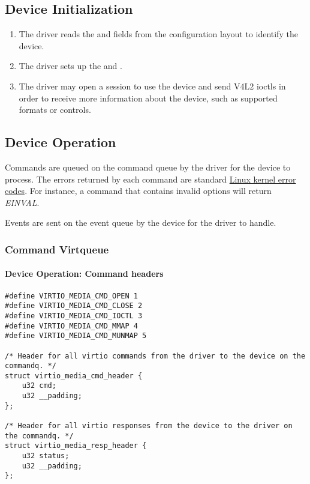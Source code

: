 \subsection{Device Initialization}

\begin{enumerate}
\item The driver reads the  and  fields
from the configuration layout to identify the device.
\item The driver sets up the  and .
\item The driver may open a session to use the device and send V4L2 ioctls in
order to receive more information about the device, such as supported
formats or controls.
\end{enumerate}

\subsection{Device Operation}\label{sec:Device Types / Media Device / Device Operation}

Commands are queued on the command queue by the driver for the device to
process. The errors returned by each command are standard
\href{https://www.kernel.org/doc/html/latest/userspace-api/media/gen-errors.html}{Linux kernel error codes}.
For instance, a command that contains invalid options will return \textit{EINVAL}.

Events are sent on the event queue by the device for the driver to handle.

\subsubsection{Command Virtqueue}

\paragraph{Device Operation: Command headers}

\begin{lstlisting}
#define VIRTIO_MEDIA_CMD_OPEN 1
#define VIRTIO_MEDIA_CMD_CLOSE 2
#define VIRTIO_MEDIA_CMD_IOCTL 3
#define VIRTIO_MEDIA_CMD_MMAP 4
#define VIRTIO_MEDIA_CMD_MUNMAP 5

/* Header for all virtio commands from the driver to the device on the commandq. */
struct virtio_media_cmd_header {
	u32 cmd;
	u32 __padding;
};

/* Header for all virtio responses from the device to the driver on the commandq. */
struct virtio_media_resp_header {
	u32 status;
	u32 __padding;
};
\end{lstlisting}

